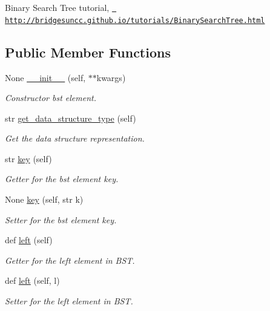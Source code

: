 Binary Search Tree tutorial, \href{http://bridgesuncc.github.io/tutorials/BinarySearchTree.html}{\texttt{ http\+://bridgesuncc.\+github.\+io/tutorials/\+Binary\+Search\+Tree.\+html}} \subsection*{Public Member Functions}
\begin{DoxyCompactItemize}
\item 
None \mbox{\hyperlink{classbridges_1_1bst__element_1_1_b_s_t_element_a0be9b75a1da9322d40811669d13e05a4}{\+\_\+\+\_\+init\+\_\+\+\_\+}} (self, $\ast$$\ast$kwargs)
\begin{DoxyCompactList}\small\item\em Constructor bst element. \end{DoxyCompactList}\item 
str \mbox{\hyperlink{classbridges_1_1bst__element_1_1_b_s_t_element_a8e655e06ba0f77b7e2681b6d291f39de}{get\+\_\+data\+\_\+structure\+\_\+type}} (self)
\begin{DoxyCompactList}\small\item\em Get the data structure representation. \end{DoxyCompactList}\item 
str \mbox{\hyperlink{classbridges_1_1bst__element_1_1_b_s_t_element_ae911a11782ad4623b21781c5eeeb7d39}{key}} (self)
\begin{DoxyCompactList}\small\item\em Getter for the bst element key. \end{DoxyCompactList}\item 
None \mbox{\hyperlink{classbridges_1_1bst__element_1_1_b_s_t_element_a646b48db2f62727bc86b51ed09069155}{key}} (self, str k)
\begin{DoxyCompactList}\small\item\em Setter for the bst element key. \end{DoxyCompactList}\item 
def \mbox{\hyperlink{classbridges_1_1bst__element_1_1_b_s_t_element_adb40ae0f98fe1cb7f153494c544d3f9f}{left}} (self)
\begin{DoxyCompactList}\small\item\em Getter for the left element in B\+ST. \end{DoxyCompactList}\item 
def \mbox{\hyperlink{classbridges_1_1bst__element_1_1_b_s_t_element_a0b45e63b73faabb6b969dd6222e07942}{left}} (self, l)
\begin{DoxyCompactList}\small\item\em Setter for the left element in B\+ST. \end{DoxyCompactList}\item 
$$
\end{DoxyCompactItemize}
